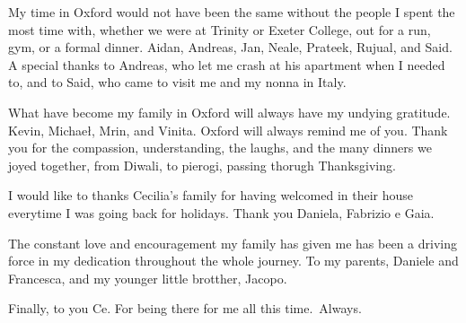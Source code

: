 My time in Oxford would not have been the same without the people I spent the most time with, whether we were at Trinity or Exeter College, out for a run, gym, or a formal dinner. Aidan, Andreas, Jan, Neale, Prateek, Rujual, and Said. A special thanks to Andreas, who let me crash at his apartment when I needed to, and to Said, who came to visit me and my nonna in Italy.

What have become my family in Oxford will always have my undying gratitude. Kevin, Michae\l{}, Mrin, and Vinita. Oxford will always remind me of you. Thank you for the compassion, understanding, the laughs, and the many dinners we joyed together, from Diwali, to pierogi, passing thorugh Thanksgiving.

I would like to thanks Cecilia's family for having welcomed in their house everytime I was going back for holidays. Thank you Daniela, Fabrizio e Gaia.

The constant love and encouragement my family has given me has been a driving force in my dedication throughout the whole journey. To my parents, Daniele and Francesca, and my younger little brotther, Jacopo.

Finally, to you Ce. For being there for me all this time.\ Always.

